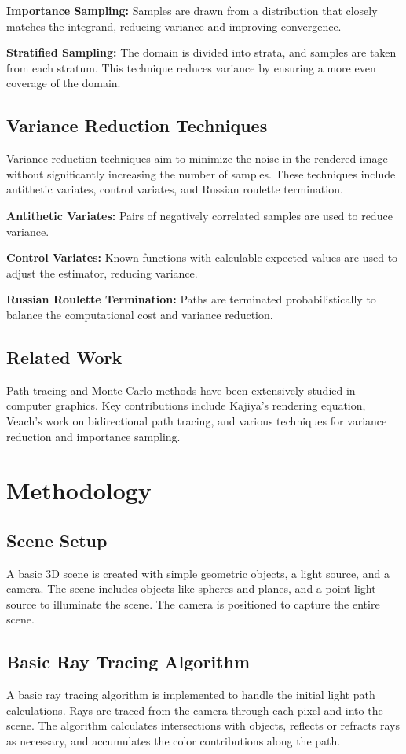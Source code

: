 \documentclass[12pt]{article}
\begin{document}
\textbf{Importance Sampling:} Samples are drawn from a distribution that closely matches the integrand, reducing variance and improving convergence.

\textbf{Stratified Sampling:} The domain is divided into strata, and samples are taken from each stratum. This technique reduces variance by ensuring a more even coverage of the domain.

\subsection{Variance Reduction Techniques}
Variance reduction techniques aim to minimize the noise in the rendered image without significantly increasing the number of samples. These techniques include antithetic variates, control variates, and Russian roulette termination.

\textbf{Antithetic Variates:} Pairs of negatively correlated samples are used to reduce variance.

\textbf{Control Variates:} Known functions with calculable expected values are used to adjust the estimator, reducing variance.

\textbf{Russian Roulette Termination:} Paths are terminated probabilistically to balance the computational cost and variance reduction.

\subsection{Related Work}
Path tracing and Monte Carlo methods have been extensively studied in computer graphics. Key contributions include Kajiya's rendering equation, Veach's work on bidirectional path tracing, and various techniques for variance reduction and importance sampling.

\section{Methodology}
\label{sec:methodology}
\subsection{Scene Setup}
A basic 3D scene is created with simple geometric objects, a light source, and a camera. The scene includes objects like spheres and planes, and a point light source to illuminate the scene. The camera is positioned to capture the entire scene.

\subsection{Basic Ray Tracing Algorithm}
A basic ray tracing algorithm is implemented to handle the initial light path calculations. Rays are traced from the camera through each pixel and into the scene. The algorithm calculates intersections with objects, reflects or refracts rays as necessary, and accumulates the color contributions along the path.
\end{document}

